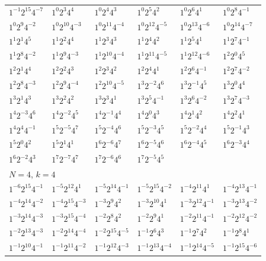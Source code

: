 \documentclass[12pt]{amsart}
\numberwithin{equation}{section}
\theoremstyle{plain}
\theoremstyle{definition}
\theoremstyle{remark}
\begin{document}
\begin{longtable}{llllll}
$1^{-1}2^{15}4^{-7}$ & $1^{0}2^{3}4^{4}$ & $1^{0}2^{4}4^{3}$ & $1^{0}2^{5}4^{2}$ & $1^{0}2^{6}4^{1}$ & $1^{0}2^{8}4^{-1}$\\
$1^{0}2^{9}4^{-2}$ & $1^{0}2^{10}4^{-3}$ & $1^{0}2^{11}4^{-4}$ & $1^{0}2^{12}4^{-5}$ & $1^{0}2^{13}4^{-6}$ & $1^{0}2^{14}4^{-7}$\\
$1^{1}2^{1}4^{5}$ & $1^{1}2^{2}4^{4}$ & $1^{1}2^{3}4^{3}$ & $1^{1}2^{4}4^{2}$ & $1^{1}2^{5}4^{1}$ & $1^{1}2^{7}4^{-1}$\\
$1^{1}2^{8}4^{-2}$ & $1^{1}2^{9}4^{-3}$ & $1^{1}2^{10}4^{-4}$ & $1^{1}2^{11}4^{-5}$ & $1^{1}2^{12}4^{-6}$ & $1^{2}2^{0}4^{5}$\\
$1^{2}2^{1}4^{4}$ & $1^{2}2^{2}4^{3}$ & $1^{2}2^{3}4^{2}$ & $1^{2}2^{4}4^{1}$ & $1^{2}2^{6}4^{-1}$ & $1^{2}2^{7}4^{-2}$\\
$1^{2}2^{8}4^{-3}$ & $1^{2}2^{9}4^{-4}$ & $1^{2}2^{10}4^{-5}$ & $1^{3}2^{-2}4^{6}$ & $1^{3}2^{-1}4^{5}$ & $1^{3}2^{0}4^{4}$\\
$1^{3}2^{1}4^{3}$ & $1^{3}2^{2}4^{2}$ & $1^{3}2^{3}4^{1}$ & $1^{3}2^{5}4^{-1}$ & $1^{3}2^{6}4^{-2}$ & $1^{3}2^{7}4^{-3}$\\
$1^{4}2^{-3}4^{6}$ & $1^{4}2^{-2}4^{5}$ & $1^{4}2^{-1}4^{4}$ & $1^{4}2^{0}4^{3}$ & $1^{4}2^{1}4^{2}$ & $1^{4}2^{2}4^{1}$\\
$1^{4}2^{4}4^{-1}$ & $1^{5}2^{-5}4^{7}$ & $1^{5}2^{-4}4^{6}$ & $1^{5}2^{-3}4^{5}$ & $1^{5}2^{-2}4^{4}$ & $1^{5}2^{-1}4^{3}$\\
$1^{5}2^{0}4^{2}$ & $1^{5}2^{1}4^{1}$ & $1^{6}2^{-6}4^{7}$ & $1^{6}2^{-5}4^{6}$ & $1^{6}2^{-4}4^{5}$ & $1^{6}2^{-3}4^{4}$\\
$1^{6}2^{-2}4^{3}$ & $1^{7}2^{-7}4^{7}$ & $1^{7}2^{-6}4^{6}$ & $1^{7}2^{-5}4^{5}$ & &\\
\midrule
\multicolumn{6}{l}{$N=4$, $k=4$}\\
$1^{-6}2^{15}4^{-1}$ & $1^{-5}2^{12}4^{1}$ & $1^{-5}2^{14}4^{-1}$ & $1^{-5}2^{15}4^{-2}$ & $1^{-4}2^{11}4^{1}$ & $1^{-4}2^{13}4^{-1}$\\
$1^{-4}2^{14}4^{-2}$ & $1^{-4}2^{15}4^{-3}$ & $1^{-3}2^{9}4^{2}$ & $1^{-3}2^{10}4^{1}$ & $1^{-3}2^{12}4^{-1}$ & $1^{-3}2^{13}4^{-2}$\\
$1^{-3}2^{14}4^{-3}$ & $1^{-3}2^{15}4^{-4}$ & $1^{-2}2^{8}4^{2}$ & $1^{-2}2^{9}4^{1}$ & $1^{-2}2^{11}4^{-1}$ & $1^{-2}2^{12}4^{-2}$\\
$1^{-2}2^{13}4^{-3}$ & $1^{-2}2^{14}4^{-4}$ & $1^{-2}2^{15}4^{-5}$ & $1^{-1}2^{6}4^{3}$ & $1^{-1}2^{7}4^{2}$ & $1^{-1}2^{8}4^{1}$\\
$1^{-1}2^{10}4^{-1}$ & $1^{-1}2^{11}4^{-2}$ & $1^{-1}2^{12}4^{-3}$ & $1^{-1}2^{13}4^{-4}$ & $1^{-1}2^{14}4^{-5}$ & $1^{-1}2^{15}4^{-6}$\\

\end{longtable}
\end{document}

